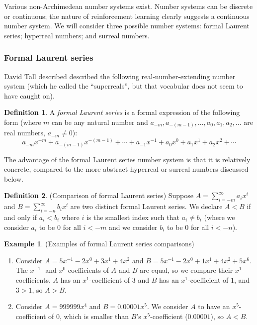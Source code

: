 \documentclass[reqno]{article}
\theoremstyle{definition}
\newtheorem{example}[theorem]{Example}
\newtheorem{definition}{Definition}
\begin{document}
Various non-Archimedean number systems exist. Number systems can be
discrete or continuous; the nature of reinforcement learning clearly
suggests a continuous number system. We will consider three possible
number systems: formal Laurent series; hyperreal numbers; and
surreal numbers.

\subsubsection{Formal Laurent series}

David Tall described \cite{tall1980looking} described the following
real-number-extending number system (which he called the ``superreals'', but
that vocabular does not seem to have caught on).

\begin{definition}
A \emph{formal Laurent series} is a formal expression of the following form
(where $m$ can be any natural number and $a_{-m},a_{-(m-1)},\ldots,a_0,a_1,a_2,\ldots$
are real numbers, $a_{-m}\not=0$):
\[
a_{-m}x^{-m} + a_{-(m-1)}x^{-(m-1)} + \cdots + a_{-1}x^{-1} + a_0x^0 + a_1x^1 + a_2x^2 + \cdots
\]
\end{definition}

The advantage of the formal Laurent series number system is that it is
relatively concrete, compared to the more abstract hyperreal or surreal numbers
discussed below.

\begin{definition}
(Comparison of formal Laurent series)
Suppose $A=\sum_{i=-m}^\infty a_ix^i$
and $B=\sum_{i=-n}^\infty b_ix^i$ are two distinct formal Laurent series.
We declare $A<B$ if and only if $a_i<b_i$ where $i$ is the smallest
index such that $a_i\not=b_i$ (where we consider $a_i$ to be $0$ for all
$i<-m$ and we consider $b_i$ to be $0$ for all $i<-n$).
\end{definition}

\begin{example}
(Examples of formal Laurent series comparisons)
\begin{enumerate}
    \item Consider $A=5x^{-1}-2x^{0}+3x^1+4x^2$ and
    $B=5x^{-1}-2x^0+1x^1+4x^2+5x^6$.
    The $x^{-1}$- and $x^0$-coefficients of $A$ and $B$ are equal, so
    we compare their $x^1$-coefficients. $A$ has an $x^1$-coefficient of $3$ and
    $B$ has an $x^1$-coefficient of $1$, and $3>1$, so $A>B$.
    \item Consider $A=999999x^4$ and $B=0.00001x^{5}$.
    We consider $A$ to have an $x^{5}$-coefficient of $0$, which is smaller than
    $B$'s $x^{5}$-coefficient ($0.00001$), so $A<B$.
\end{enumerate}
\end{example}
\end{document}
